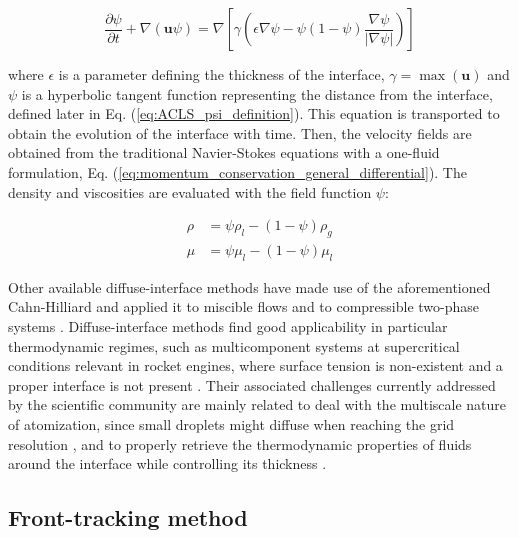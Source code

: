 \begin{equation}
\frac{\partial \psi}{\partial t} + \nabla \left( \textbf{u}  \psi \right) = \nabla \left[ \gamma \left( \epsilon \nabla \psi - \psi \left( 1 - \psi \right) \frac{\nabla \psi}{| \nabla \psi |} \right) \right]
\end{equation}

where $\epsilon$ is a parameter defining the thickness of the interface, $\gamma = \max \left( \textbf{u} \right)$  and $\psi$ is a hyperbolic tangent function representing the distance from the interface, defined later in Eq. (\ref{eq:ACLS_psi_definition}). This equation is transported to obtain the evolution of the interface with time. Then, the velocity fields are obtained from the traditional Navier-Stokes equations with a one-fluid formulation, Eq. (\ref{eq:momentum_conservation_general_differential}). The density and viscosities are evaluated with the field function $\psi$:

\begin{subequations}
\begin{align}
\rho &= \psi \rho_l - \left( 1 -  \psi \right) \rho_g  \\
\mu &= \psi \mu_l   - \left( 1 -  \psi \right) \mu_l
\end{align}
\end{subequations}

Other available diffuse-interface methods have made use of the aforementioned Cahn-Hilliard and applied it to miscible flows  and to compressible two-phase systems . Diffuse-interface methods find good applicability in particular thermodynamic regimes, such as multicomponent systems at supercritical conditions relevant in rocket engines, where surface tension is non-existent and a proper interface is not present .   Their associated challenges currently addressed by the scientific community are mainly related to deal with the multiscale nature of atomization, since small droplets might diffuse when reaching the grid resolution  , and to properly retrieve the thermodynamic properties of fluids around the interface while controlling its thickness .



\subsection{Front-tracking method}

